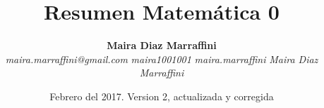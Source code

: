 \title{Resumen Matemática 0}
\author{\textbf{Maira Diaz Marraffini} 
\\
\emph{maira.marraffini@gmail.com} 
\emph{\faGithub maira1001001} 
\emph{\faInstagram maira.marraffini}
\emph{\faLinkedinSquare Maira Diaz Marraffini} }
\date{Febrero del 2017. Version 2, actualizada  y corregida}

